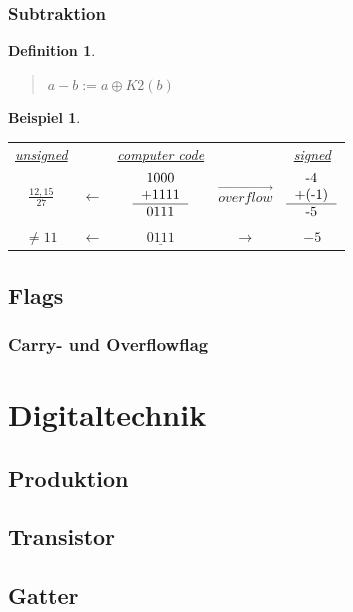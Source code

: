 \documentclass{report}
\newtheorem{mydef}{Definition}
\newtheorem{myexample}{Beispiel}
\begin{document}
\subsection{Subtraktion}
\begin{mydef}\begin{quote}$a - b := a \oplus K2(b)$\end{quote}\end{mydef}

\begin{myexample}\begin{tabular}{c c c c c}
\underline{unsigned} & & \underline{computer code} & & \underline{signed} \\
$\frac{12,15}{27}$ & $\leftarrow$ & $\begin{tabular}{c} 1000 \\ +1111 \\ \hline  0111  \\ \end{tabular} $ & $\overrightarrow{overflow}$ & $\begin{tabular}{c} -4 \\
+(-1) \\ \hline
-5 \\
\end{tabular} $ \\
$\not= 11$ & $\leftarrow$ & $\underline{0111} $ & $\rightarrow$ & $-5$ \\
\end{tabular}\end{myexample}
\section{Flags}
\subsection{Carry- und Overflowflag}
\chapter{Digitaltechnik}
\section{Produktion}
\section{Transistor}
\section{Gatter}
\end{document}
